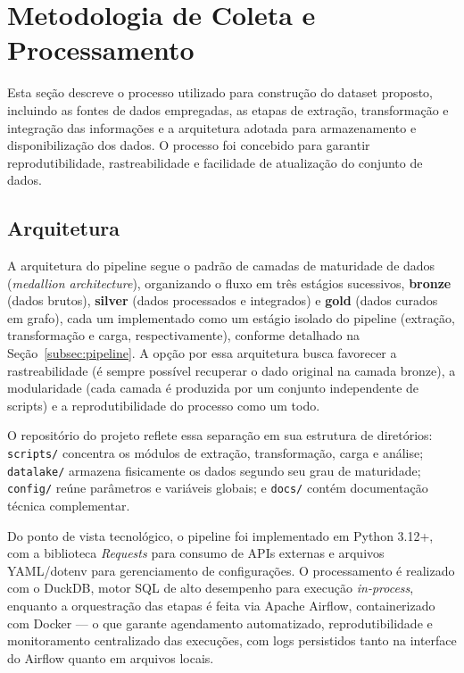 \section{Metodologia de Coleta e Processamento}

Esta seção descreve o processo utilizado para construção do dataset proposto, incluindo as fontes de dados empregadas, as etapas de extração, transformação e integração das informações e a arquitetura adotada para armazenamento e disponibilização dos dados. O processo foi concebido para garantir reprodutibilidade, rastreabilidade e facilidade de atualização do conjunto de dados.



\subsection{Arquitetura}
\label{subsec:arquitetura}

A arquitetura do pipeline segue o padrão de camadas de maturidade de dados (\textit{medallion architecture}), organizando o fluxo em três estágios sucessivos, \textbf{bronze} (dados brutos), \textbf{silver} (dados processados e integrados) e \textbf{gold} (dados curados em grafo), cada um implementado como um estágio isolado do pipeline (extração, transformação e carga, respectivamente), conforme detalhado na Seção~\ref{subsec:pipeline}. A opção por essa arquitetura busca favorecer a rastreabilidade (é sempre possível recuperar o dado original na camada bronze), a modularidade (cada camada é produzida por um conjunto independente de scripts) e a reprodutibilidade do processo como um todo.

O repositório do projeto reflete essa separação em sua estrutura de diretórios: \texttt{scripts/} concentra os módulos de extração, transformação, carga e análise; \texttt{datalake/} armazena fisicamente os dados segundo seu grau de maturidade; \texttt{config/} reúne parâmetros e variáveis globais; e \texttt{docs/} contém documentação técnica complementar.

Do ponto de vista tecnológico, o pipeline foi implementado em Python 3.12+, com a biblioteca \textit{Requests} para consumo de APIs externas e arquivos YAML/dotenv para gerenciamento de configurações. O processamento é realizado com o DuckDB, motor SQL de alto desempenho para execução \textit{in-process}, enquanto a orquestração das etapas é feita via Apache Airflow, containerizado com Docker --- o que garante agendamento automatizado, reprodutibilidade e monitoramento centralizado das execuções, com logs persistidos tanto na interface do Airflow quanto em arquivos locais.


